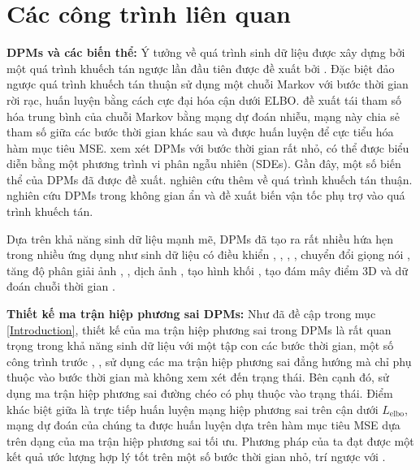 \documentclass[14pt, a4paper]{article}
\numberwithin{equation}{section}
\numberwithin{figure}{section}
\numberwithin{dl}{section}
\numberwithin{md}{section}
\numberwithin{bd}{section}
\numberwithin{dn}{section}
\numberwithin{hq}{section}
\begin{document}
    \section{Các công trình liên quan}

    \textbf{DPMs và các biến thể:} Ý tưởng về quá trình sinh dữ liệu được xây dựng bởi một quá trình khuếch tán ngược lần đầu tiên được đề xuất bởi \cite{sohl2015deep}.
    Đặc biệt \cite{sohl2015deep} đảo ngược quá trình khuếch tán thuận sử dụng một chuỗi Markov với bước thời gian rời rạc, huấn luyện bằng cách cực đại hóa cận dưới ELBO.
    \cite{ho2020denoising} đề xuất tái tham số hóa trung bình của chuỗi Markov bằng mạng dự đoán nhiễu, mạng này chia sẻ tham số giữa các bước thời gian khác sau và được huấn luyện để cực tiểu hóa hàm mục tiêu MSE.
    \cite{song2020score} xem xét DPMs với bước thời gian rất nhỏ, có thể được biểu diễn bằng một phương trình vi phân ngẫu nhiên (SDEs).
    Gần đây, một số biến thể của DPMs đã được đề xuất. \cite{kingma2021variational} nghiên cứu thêm về quá trình khuếch tán thuận.
    \cite{vahdat2021score} nghiên cứu DPMs trong không gian ẩn và \cite{dockhorn2021score} đề xuất biến vận tốc phụ trợ vào quá trình khuếch tán.

    Dựa trên khả năng sinh dữ liệu mạnh mẽ, DPMs đã tạo ra rất nhiều hứa hẹn trong nhiều ứng dụng như sinh dữ liệu có điều khiển \cite{choi2021ilvr}, \cite{meng2021sdedit}, \cite{sinha2021d2c}, \cite{nichol2021glide},
    chuyển đổi giọng nói \cite{popov2021diffusion}, tăng độ phân giải ảnh \cite{saharia2021image}, \cite{li2022srdiff}, dịch ảnh \cite{sasaki2021unit}, tạo hình khối \cite{zhou20213d},
    tạo đám mây điểm 3D \cite{luo2021diffusion} và dữ đoán chuỗi thời gian \cite{rasul2021autoregressive}.

    \textbf{Thiết kế ma trận hiệp phương sai DPMs:} Như đã đề cập trong mục \ref{Introduction}, thiết kế của ma trận hiệp phương sai trong DPMs là rất quan trọng trong khả năng sinh dữ liệu với một tập con các bước thời gian,
    một số công trình trước \cite{ho2020denoising}, \cite{song2020denoising}, \cite{bao2021analytic} sử dụng các ma trận hiệp phương sai đẳng hướng mà chỉ phụ thuộc vào bước thời gian mà không xem xét đến trạng thái.
    Bên cạnh đó, \cite{nichol2021improved} sử dụng ma trận hiệp phương sai đường chéo có phụ thuộc vào trạng thái.
    Điểm khác biệt giữa \cite{nichol2021improved} là trực tiếp huấn luyện mạng hiệp phương sai trên cận dưới $L_{\mathrm{elbo}}$,
    mạng dự đoán của chúng ta được huấn luyện dựa trên hàm mục tiêu MSE dựa trên dạng của ma trận hiệp phương sai tối ưu.
    Phương pháp của ta đạt được một kết quả ước lượng hợp lý tốt trên một số bước thời gian nhỏ, trí ngược với \cite{nichol2021improved}.
\end{document}
